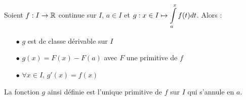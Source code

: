 \documentclass[a4paper, 11pt]{article}
\begin{document}
{{{{

		\begin{prop}
			Soient $f: I\rightarrow \mathbb{R}$ continue sur $I$, $a\in I$ et $g: x\in I\mapsto \displaystyle\int\limits_a^x f(t)dt$. Alors :
			\begin{itemize}
				\item[$\bullet$] $g$ est de classe dérivable sur $I$
				\item[$\bullet$] $g(x) =F(x) -F(a)$ avec $F$ une primitive de $f$
				\item[$\bullet$] $\forall x\in I, \, g'(x) = f(x)$
			\end{itemize}
		\end{prop}
	}

\begin{rem}
	La fonction $g$ ainsi d\'efinie est l'unique primitive de $f$ sur $I$ qui s'annule en $a$.
\end{rem}



% 
%
%
%
%
%
%
%
%
%
%
%
% 


}}}
\end{document}
